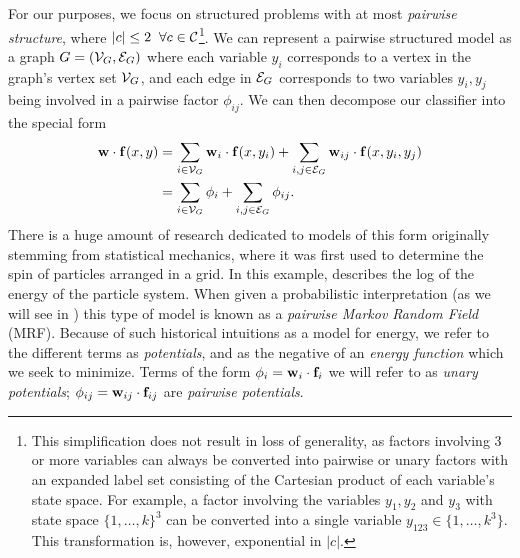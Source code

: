 For our purposes, we focus on structured problems with at most {\em pairwise 
structure}, where $|c| \leq 2\;\; \forall c \in \mathcal{C}$\footnote{This 
simplification does not result in loss of generality, as factors involving 3 or 
more variables can always be converted into pairwise or unary factors with an 
expanded label set consisting of the Cartesian product of each variable's state 
space. For example, a factor involving the variables $y_1,y_2$ and $y_3$ with 
state space $\{1,\ldots,k\}^3$ can be converted into a single variable $y_{123} 
\in \{1,\ldots,k^3\}$.  This transformation is, however, exponential in 
$|c|$.}.  We can represent a pairwise structured model as a graph $G = 
(\mathcal{V}_G,\mathcal{E}_G)$ where each variable $y_i$ corresponds to a vertex in the graph's 
vertex set $\mathcal{V}_G$, and each edge in $\mathcal{E}_G$ corresponds to two variables 
$y_i,y_j$ being involved in a pairwise factor $\phi_{ij}$.  We can then 
decompose our classifier into the special form
\begin{align}
\mathbf{w} \cdot \mathbf{f}(x,y) &= \sum_{i \in \mathcal{V}_G} \mathbf{w}_i \cdot \mathbf{f}(x,y_i) + \sum_{i,j \in 
\mathcal{E}_G} \mathbf{w}_{ij} \cdot \mathbf{f}(x,y_i,y_j) \\
& = \sum_{i \in \mathcal{V}_G} \phi_i + \sum_{i,j \in \mathcal{E}_G} \phi_{ij}.
\label{eq:mrf}
\end{align} There is a huge amount of research dedicated to models of this form 
originally stemming from statistical mechanics, where it was first used to 
determine the spin of particles arranged in a grid. In this example, 
 describes the log of the energy of the particle system.  When 
given a probabilistic interpretation (as we will see in )
this type of model is known as a {\em pairwise Markov Random Field} (MRF).  
Because of such historical intuitions as a model for energy, we refer to the 
different terms as {\em potentials}, and  as the negative of an 
{\em energy function} which we seek to minimize.  Terms of the form $\phi_i = 
\mathbf{w}_i \cdot \mathbf{f}_i$ we will refer to as {\em unary potentials}; $\phi_{ij} = 
\mathbf{w}_{ij} \cdot \mathbf{f}_{ij}$ are {\em pairwise potentials}.

